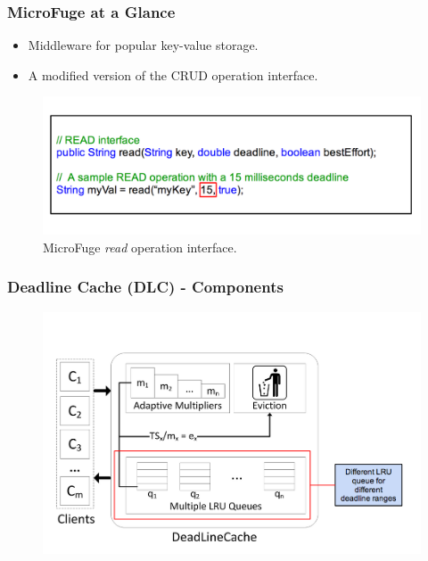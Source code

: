 \documentclass{beamer}
\newcommand{\myv}{\vspace{3 mm}}
\begin{document}
\begin{frame}
  \frametitle{MicroFuge at a Glance}
  \begin{itemize}
  \item Middleware for popular key-value storage.
    \myv
  \item A modified version of the CRUD operation interface.
  \end{itemize}
  \begin{figure}
\vspace{-5 mm}
  \includegraphics[scale=0.25]{img/MicroFuge_protocol.png}
  \caption{MicroFuge \textit{read} operation interface.}
  \end{figure}
\end{frame}

\begin{frame}
  \frametitle{Deadline Cache (DLC) - Components}
  \begin{figure}
    \begin{center}
      \centerline{\includegraphics[scale=0.35]{img/DLC_ARC_1.png}}
    \end{center}
  \end{figure}
\end{frame}
\end{document}
